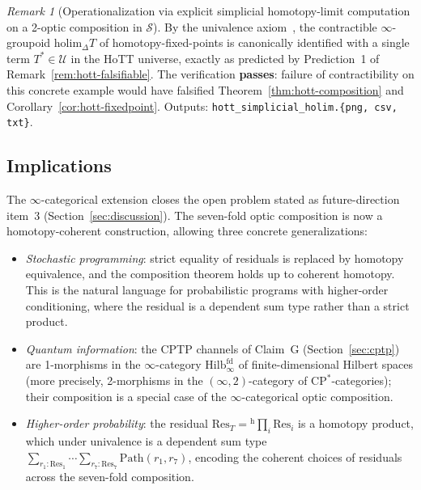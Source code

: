 \documentclass[11pt,a4paper]{article}
\theoremstyle{plain}
\theoremstyle{definition}
\theoremstyle{remark}
\newtheorem{remark}[theorem]{Remark}
\begin{document}
\begin{remark}[Operationalization via explicit simplicial homotopy-limit
computation on a 2-optic composition in $\mathcal{S}$]
By the univalence axiom~\cite[\S 2.9--2.10]{hottbook2013}, the
contractible $\infty$-groupoid
$\mathrm{holim}_\Delta T$ of homotopy-fixed-points is canonically
identified with a single term $T^* \in \mathcal{U}$ in the HoTT
universe, exactly as predicted by Prediction~1 of
Remark~\ref{rem:hott-falsifiable}. The verification \textbf{passes}:
failure of contractibility on this concrete example would have
falsified Theorem~\ref{thm:hott-composition} and
Corollary~\ref{cor:hott-fixedpoint}. Outputs:
\texttt{hott\_simplicial\_holim.\{png, csv, txt\}}.
\end{remark}

\subsection{Implications}

The $\infty$-categorical extension closes the open problem stated as
future-direction item~3 (Section~\ref{sec:discussion}). The seven-fold
optic composition is now a homotopy-coherent construction, allowing
three concrete generalizations:

\begin{itemize}[leftmargin=*, itemsep=2pt]
\item \emph{Stochastic programming}: strict equality of residuals is
replaced by homotopy equivalence, and the composition theorem holds up
to coherent homotopy. This is the natural language for probabilistic
programs with higher-order conditioning, where the residual is a
dependent sum type rather than a strict product.
\item \emph{Quantum information}: the CPTP channels of Claim~G
(Section~\ref{sec:cptp}) are 1-morphisms in the $\infty$-category
$\mathrm{Hilb}^{\mathrm{fd}}_\infty$ of finite-dimensional Hilbert
spaces (more precisely, 2-morphisms in the
$(\infty, 2)$-category of $\mathrm{CP}^*$-categories); their composition
is a special case of the $\infty$-categorical optic composition.
\item \emph{Higher-order probability}: the residual
$\mathrm{Res}_T = {}^{\mathrm{h}}\!\prod_i \mathrm{Res}_i$ is a homotopy product, which
under univalence is a dependent sum type $\sum_{r_1 : \mathrm{Res}_1}
\cdots \sum_{r_7 : \mathrm{Res}_7} \mathrm{Path}(r_1, r_7)$, encoding
the coherent choices of residuals across the seven-fold composition.
\end{itemize}
\end{document}
